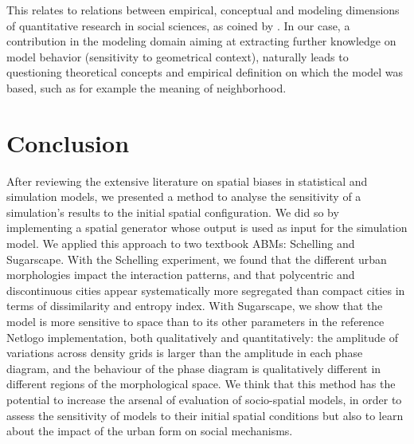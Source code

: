 \documentclass{JASSS}
\begin{document}
This relates to relations between empirical, conceptual and modeling dimensions of quantitative research in social sciences, as coined by \cite{livet2010ontology}. In our case, a contribution in the modeling domain aiming at extracting further knowledge on model behavior (sensitivity to geometrical context), naturally leads to questioning theoretical concepts and empirical definition on which the model was based, such as for example the meaning of neighborhood.



\section{Conclusion}

After reviewing the extensive literature on spatial biases in statistical and simulation models, we presented a method to analyse the sensitivity of a simulation's results to the initial spatial configuration. We did so by implementing a spatial generator whose output is used as input for the simulation model. We applied this approach to two textbook ABMs: Schelling and Sugarscape. With the Schelling experiment, we found that the different urban morphologies impact the interaction patterns, and that polycentric and discontinuous cities appear systematically more segregated than compact cities in terms of dissimilarity and entropy index. With Sugarscape, we show that the model is more sensitive to space than to its other parameters in the reference Netlogo implementation, both qualitatively and quantitatively: the amplitude of variations across density grids is larger than the amplitude in each phase diagram, and the behaviour of the phase diagram is qualitatively different in different regions of the morphological space. We think that this method has the potential to increase the arsenal of evaluation of socio-spatial models, in order to assess the sensitivity of models to their initial spatial conditions but also to learn about the impact of the urban form on social mechanisms.


\end{document}
